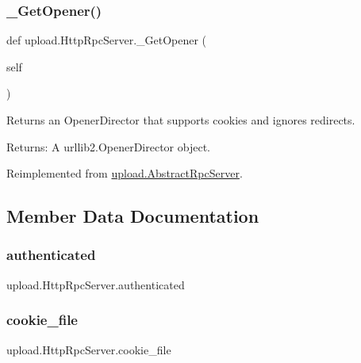\subsubsection{\texorpdfstring{\_GetOpener()}{\_GetOpener()}\hspace{0.1cm}{\footnotesize\ttfamily [2/2]}}
{\footnotesize\ttfamily def upload.\+Http\+Rpc\+Server.\+\_\+\+Get\+Opener (\begin{DoxyParamCaption}\item[{}]{self }\end{DoxyParamCaption})\hspace{0.3cm}{\ttfamily [private]}}

\begin{DoxyVerb}Returns an OpenerDirector that supports cookies and ignores redirects.

Returns:
  A urllib2.OpenerDirector object.
\end{DoxyVerb}
 

Reimplemented from \mbox{\hyperlink{classupload_1_1_abstract_rpc_server_a388a9974eab1157ba4785e2ab2c33be9}{upload.\+Abstract\+Rpc\+Server}}.



\subsection{Member Data Documentation}
\mbox{\label{classupload_1_1_http_rpc_server_aaa356e2491537dd0d4bfc5b1bb0fec96}} 
\subsubsection{\texorpdfstring{authenticated}{authenticated}}
{\footnotesize\ttfamily upload.\+Http\+Rpc\+Server.\+authenticated}

\mbox{\label{classupload_1_1_http_rpc_server_ad5c1a730c030f9d3b5f70c2e0d8b9a1d}} 
\subsubsection{\texorpdfstring{cookie\_file}{cookie\_file}}
{\footnotesize\ttfamily upload.\+Http\+Rpc\+Server.\+cookie\+\_\+file}

